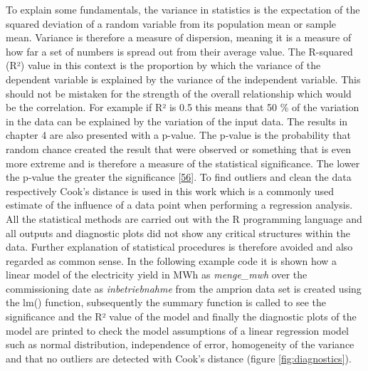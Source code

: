 \documentclass[a4paper,11pt]{article}
\begin{document}
To explain some fundamentals, the variance in statistics is the expectation of the squared deviation of a random variable from its population mean or sample mean. Variance is therefore a measure of dispersion, meaning it is a measure of how far a set of numbers is spread out from their average value. The R-squared (R²) value in this context is the proportion by which the variance of the dependent variable is explained by the variance of the independent variable. This should not be mistaken for the strength of the overall relationship which would be the correlation. For example if R² is 0.5 this means that 50 \% of the variation in the data can be explained by the variation of the input data. The results in chapter 4 are also presented with a p-value. The p-value is the probability that random chance created the result that were observed or something that is even more extreme and is therefore a measure of the statistical significance. The lower the p-value the greater the significance {[}\protect\hyperlink{ref-LeoH.Kahane.2006}{56}{]}. To find outliers and clean the data respectively Cook's distance is used in this work which is a commonly used estimate of the influence of a data point when performing a regression analysis. All the statistical methods are carried out with the R programming language and all outputs and diagnostic plots did not show any critical structures within the data. Further explanation of statistical procedures is therefore avoided and also regarded as common sense. In the following example code it is shown how a linear model of the electricity yield in MWh as \emph{menge\_mwh} over the commissioning date as \emph{inbetriebnahme} from the amprion data set is created using the lm() function, subsequently the summary function is called to see the significance and the R² value of the model and finally the diagnostic plots of the model are printed to check the model assumptions of a linear regression model such as normal distribution, independence of error, homogeneity of the variance and that no outliers are detected with Cook's distance (figure \ref{fig:diagnostics}).
\end{document}
